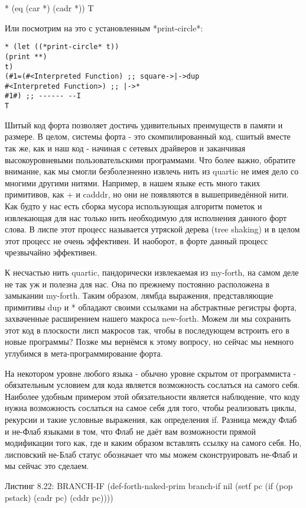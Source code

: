 {{{* (eq (car *) (cadr *))
T

Или посмотрим на это с установленным *print-circle*:

\begin{verbatim}
* (let ((*print-circle* t))
(print **)
t)
(#1=(#<Interpreted Function) ;; square->|->dup
#<Interpreted Function>) ;; |->*
#1#) ;; ------ --I
T
\end{verbatim}

Шитый код форта позволяет достичь удивительных преимуществ в памяти и размере. В целом, системы форта - это скомпилированный код, сшитый вместе так же, как и наш код - начиная с сетевых драйверов и заканчивая высокоуровневыми пользовательскими программами. Что более важно, обратите внимание, как мы смогли безболезненно извлечь нить из quartic не имея дело со многими другими нитями. Например, в нашем языке есть много таких примитивов, как + и cadddr, но они не появляются в вышеприведённой нити. Как будто у нас есть сборка мусора использующая алгоритм пометок и извлекающая для нас только нить необходимую для исполнения данного форт слова. В лиспе этот процесс называется утряской дерева (tree shaking) и в целом этот процесс не очень эффективен. И наоборот, в форте данный процесс чрезвычайно эффективен.

К несчастью нить quartic, пандорически извлекаемая из my-forth, на самом деле не так уж и полезна для нас. Она по прежнему постоянно расположена в замыкании my-forth. Таким образом, лямбда выражения, представляющие примитивы dup и * обладают своими ссылками на абстрактные регистры форта, захваченные расширением нашего макроса new-forth. Можем ли мы сохранить этот код в плоскости лисп макросов так, чтобы в последующем встроить его в новые программы? Позже мы вернёмся к этому вопросу, но сейчас мы немного углубимся в мета-программирование форта.

На некотором уровне любого языка - обычно уровне скрытом от программиста - обязательным условием для кода является возможность сослаться на самого себя. Наиболее удобным примером этой обязательности является наблюдение, что коду нужна возможность сослаться на самое себя для того, чтобы реализовать циклы, рекурсии и такие условные выражения, как определения if. Разница между Флаб и не-Флаб языками в том, что Флаб не даёт вам возможности прямой модификации того как, где и каким образом вставлять ссылку на самого себя. Но, лисповский не-Блаб статус обозначает что мы можем сконструировать не-Флаб и мы сейчас это сделаем.

Листинг 8.22: BRANCH-IF
(def-forth-naked-prim branch-if nil
(setf pc (if (pop pstack)
(cadr pc)
(cddr pc))))

}}}
